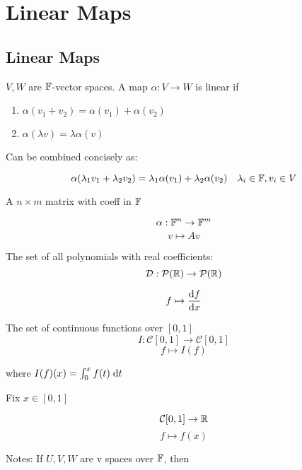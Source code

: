 \documentclass[a4paper]{article}
\begin{document}
\section{Linear Maps}

\subsection{Linear Maps}

\begin{defi}
	$ V,W $ are $ \mathbb{F} $-vector spaces. A map $ \alpha: V \to W $ is linear if
	
	\begin{enumerate}
		\item $ \alpha(v_{1} + v_{2}) = \alpha(v_{1}) + \alpha(v_{2}) $
		\item $ \alpha(\lambda v) = \lambda \alpha(v) $
		
	\end{enumerate}

Can be combined concisely as: 

\[  \alpha(\lambda_{1} v_{1} + \lambda_{2} v_{2}) = \lambda_{1} \alpha(v_{1}) + \lambda_{2} \alpha(v_{2})  \quad \lambda_{i} \in \mathbb{F}, v_{i} \in V  \]
\end{defi}

\begin{eg}
	A $ n \times m $ matrix with coeff in $ \mathbb{F} $
	
	\[ \alpha: \mathbb{F}^{n} \to \mathbb{F}^{m} \]
	\[ v \mapsto A v \]
\end{eg}

\begin{eg}
	The set of all polynomials with real coefficients:
	\[ \mathcal{D} : \mathcal{P}(\mathbb{R}) \to \mathcal{P}(\mathbb{R}) \]
	
	\[ f \mapsto \frac{\mathrm{d} f}{\mathrm{d} x} \]
\end{eg}


\begin{eg}
	The set of continuous functions over $ [0,1] $
	\[ I: \mathcal{C}[0,1] \to \mathcal{C}[0,1] \]
	\[ f \mapsto I(f) \]
	
	where $ I(f)(x) = \int_{0}^{x} f(t) \; \mathrm{d} t $
\end{eg}

\begin{eg}
	Fix $ x \in [0,1] $
	
	\[ \mathcal{C}[0,1] \to \mathbb{R} \]
	\[ f \mapsto f(x) \]
\end{eg}

Notes: If $ U,V,W $ are v spaces over $ \mathbb{F} $, then
\end{document}
